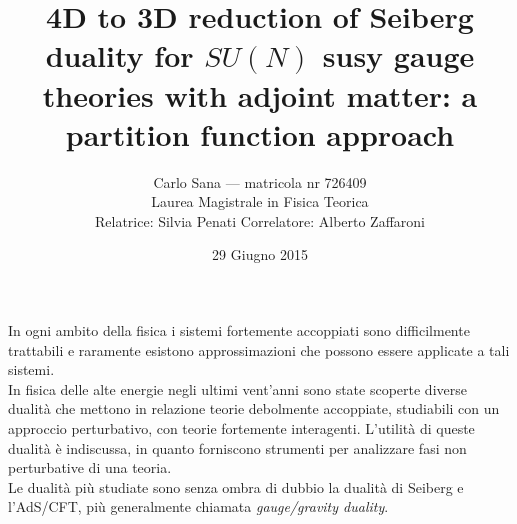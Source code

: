 \documentclass[a4paper,12pt]{article}
\author{
 Carlo Sana  --- matricola nr 726409 \\
 Laurea Magistrale in Fisica Teorica\\
Relatrice: Silvia Penati 
Correlatore: Alberto Zaffaroni\\
}
\date{29 Giugno 2015}
\title{ \textbf{4D to 3D reduction of Seiberg duality for $SU(N)$ susy gauge theories with adjoint matter: a partition function approach }}
\begin{document}
\maketitle
In ogni ambito della fisica i sistemi fortemente accoppiati sono difficilmente trattabili e raramente esistono approssimazioni che possono essere applicate a tali sistemi.
\\
In fisica delle alte energie negli ultimi vent'anni sono state scoperte diverse dualità che mettono in relazione teorie debolmente accoppiate, studiabili con un approccio perturbativo, con teorie fortemente interagenti.
L'utilità di queste dualità è indiscussa, in quanto forniscono strumenti per analizzare fasi non perturbative di una teoria. \\
Le dualità più studiate sono senza ombra di dubbio la dualità di Seiberg e l'AdS/CFT, più generalmente chiamata \emph{gauge/gravity duality}. 
\end{document}
